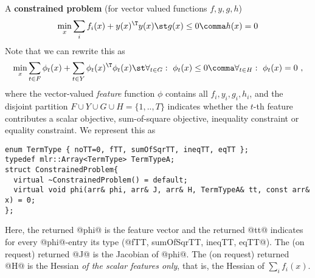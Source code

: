 \documentclass[10pt,fleqn,twoside]{article}
\begin{document}
{{A \textbf{constrained problem} (for vector valued functions $f,y,g,h$)
\begin{align}\label{eqConstrained}
\min_x \sum_i f_i(x) + y(x)^\T y(x) \st g(x) \le 0\comma h(x) = 0
\end{align}
Note that we can rewrite this as
\begin{align}
\min_x \sum_{t\in F} \phi_t(x) + \sum_{t\in Y} \phi_t(x)^\T \phi_t(x)
\st \forall_{t\in G}:~ \phi_t(x)\le 0\comma \forall_{t\in H}:~ \phi_t(x)=0 ~,
\end{align}
where the vector-valued \emph{feature} function $\phi$ contains all $f_i, y_i, g_i,
h_i$, and the disjoint partition $F \cup Y \cup G \cup H = \{1,..,T\}$ indicates whether the
$t$-th feature contributes a scalar objective, sum-of-square objective,
inequality constraint or equality constraint. We represent this as
\begin{shaded}
\begin{Verbatim}
enum TermType { noTT=0, fTT, sumOfSqrTT, ineqTT, eqTT };
typedef mlr::Array<TermType> TermTypeA;
struct ConstrainedProblem{
  virtual ~ConstrainedProblem() = default;
  virtual void phi(arr& phi, arr& J, arr& H, TermTypeA& tt, const arr& x) = 0;
};
\end{Verbatim}
\end{shaded}
Here, the returned @phi@ is the feature vector and the returned @tt@
indicates for every @phi@-entry its type
%
(@fTT, sumOfSqrTT, ineqTT, eqTT@). The (on request) returned @J@ is the Jacobian of @phi@. The
(on request) returned @H@ is the Hessian \emph{of the scalar features
  only}, that is, the Hessian of $\sum_i f_i(x)$.

}}
\end{document}
